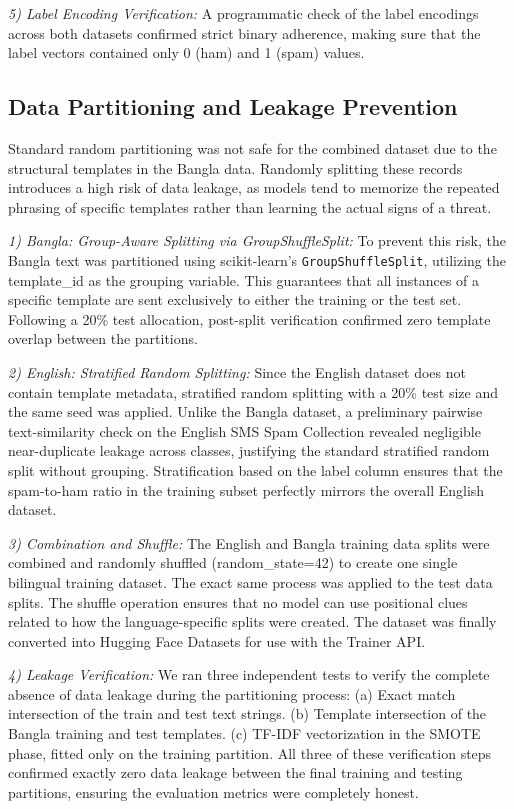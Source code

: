 \documentclass[journal]{IEEEtran}
\begin{document}
\textit{5) Label Encoding Verification:} A programmatic check of the label encodings across both datasets confirmed strict binary adherence, making sure that the label vectors contained only 0 (ham) and 1 (spam) values.

\subsection{Data Partitioning and Leakage Prevention}

Standard random partitioning was not safe for the combined dataset due to the structural templates in the Bangla data. Randomly splitting these records introduces a high risk of data leakage, as models tend to memorize the repeated phrasing of specific templates rather than learning the actual signs of a threat.

\textit{1) Bangla: Group-Aware Splitting via GroupShuffleSplit:} To prevent this risk, the Bangla text was partitioned using scikit-learn's \texttt{GroupShuffleSplit}, utilizing the template\_id as the grouping variable. This guarantees that all instances of a specific template are sent exclusively to either the training or the test set. Following a 20\% test allocation, post-split verification confirmed zero template overlap between the partitions.

\textit{2) English: Stratified Random Splitting:} Since the English dataset does not contain template metadata, stratified random splitting with a 20\% test size and the same seed was applied. Unlike the Bangla dataset, a preliminary pairwise text-similarity check on the English SMS Spam Collection revealed negligible near-duplicate leakage across classes, justifying the standard stratified random split without grouping. Stratification based on the label column ensures that the spam-to-ham ratio in the training subset perfectly mirrors the overall English dataset.

\textit{3) Combination and Shuffle:} The English and Bangla training data splits were combined and randomly shuffled (random\_state=42) to create one single bilingual training dataset. The exact same process was applied to the test data splits. The shuffle operation ensures that no model can use positional clues related to how the language-specific splits were created. The dataset was finally converted into Hugging Face Datasets for use with the Trainer API.

\textit{4) Leakage Verification:} We ran three independent tests to verify the complete absence of data leakage during the partitioning process:
(a) Exact match intersection of the train and test text strings.
(b) Template intersection of the Bangla training and test templates.
(c) TF-IDF vectorization in the SMOTE phase, fitted only on the training partition.
All three of these verification steps confirmed exactly zero data leakage between the final training and testing partitions, ensuring the evaluation metrics were completely honest.
\end{document}
